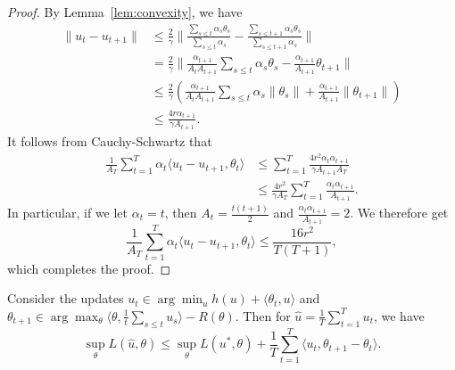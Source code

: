 \documentclass{article}
\begin{document}
\begin{proof}
By Lemma~\ref{lem:convexity}, we have 
\begin{align*}
\|u_t-u_{t+1}\| &\leq \frac{2}{\gamma}\|\frac{\sum_{s \leq t}\alpha_s\theta_s}{\sum_{s \leq t} \alpha_s} - \frac{\sum_{s \leq t+1}\alpha_s\theta_s}{\sum_{s \leq t+1} \alpha_s}\| \\
 &= \frac{2}{\gamma}\|\frac{\alpha_{t+1}}{A_tA_{t+1}} \sum_{s \leq t} \alpha_s\theta_s - \frac{\alpha_{t+1}}{A_{t+1}} \theta_{t+1}\| \\
 &\leq \frac{2}{\gamma} \left(\frac{\alpha_{t+1}}{A_tA_{t+1}} \sum_{s \leq t} \alpha_s\|\theta_s\| + \frac{\alpha_{t+1}}{A_{t+1}} \|\theta_{t+1}\|\right) \\
 &\leq \frac{4r\alpha_{t+1}}{\gamma A_{t+1}}.
\end{align*}
It follows from Cauchy-Schwartz that 
\begin{align*}
\frac{1}{A_T} \sum_{t=1}^T \alpha_t \langle u_t - u_{t+1}, \theta_t \rangle &\leq \sum_{t=1}^T \frac{4r^2\alpha_{t}\alpha_{t+1}}{\gamma A_{t+1}A_T} \\
 &\leq \frac{4r^2}{\gamma A_T} \sum_{t=1}^T \frac{\alpha_{t}\alpha_{t+1}}{A_{t+1}}.
\end{align*}
In particular, if we let $\alpha_t = t$, then $A_t = \frac{t(t+1)}{2}$ and $\frac{\alpha_{t}\alpha_{t+1}}{A_{t+1}} = 2$. 
We therefore get
\begin{equation}
\frac{1}{A_T} \sum_{t=1}^T \alpha_t\langle u_t-u_{t+1}, \theta_t \rangle \leq \frac{16r^2}{T(T+1)},
\end{equation}
which completes the proof.
\end{proof}
\begin{proposition}
\label{prop:method-2}
Consider the updates $u_t \in \arg\min_{u} h(u) + \langle \theta_t, u \rangle$ 
and $\theta_{t+1} \in \arg\max_{\theta} \langle \theta, \frac{1}{t} \sum_{s \leq t} u_s \rangle - R(\theta)$. 
Then for $\hat{u} = \frac{1}{T} \sum_{t=1}^T u_t$, we have 
\[ \sup_{\theta} L(\hat{u}, \theta) \leq \sup_{\theta} L(u^*, \theta) + \frac{1}{T} \sum_{t=1}^T \langle u_t, \theta_{t+1} - \theta_{t} \rangle. \]
\end{proposition}
\end{document}
